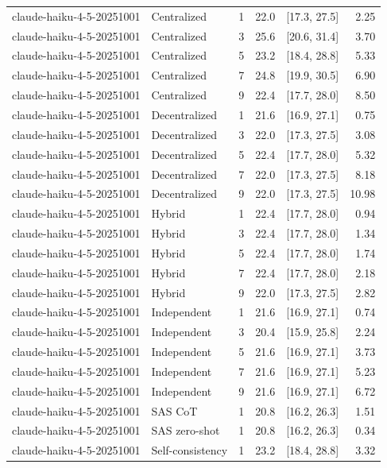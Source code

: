\begin{tabular}{@{}llrrrr@{}}
claude-haiku-4-5-20251001 & Centralized & 1 & 22.0 & [17.3, 27.5] & 2.25 \\
claude-haiku-4-5-20251001 & Centralized & 3 & 25.6 & [20.6, 31.4] & 3.70 \\
claude-haiku-4-5-20251001 & Centralized & 5 & 23.2 & [18.4, 28.8] & 5.33 \\
claude-haiku-4-5-20251001 & Centralized & 7 & 24.8 & [19.9, 30.5] & 6.90 \\
claude-haiku-4-5-20251001 & Centralized & 9 & 22.4 & [17.7, 28.0] & 8.50 \\
claude-haiku-4-5-20251001 & Decentralized & 1 & 21.6 & [16.9, 27.1] & 0.75 \\
claude-haiku-4-5-20251001 & Decentralized & 3 & 22.0 & [17.3, 27.5] & 3.08 \\
claude-haiku-4-5-20251001 & Decentralized & 5 & 22.4 & [17.7, 28.0] & 5.32 \\
claude-haiku-4-5-20251001 & Decentralized & 7 & 22.0 & [17.3, 27.5] & 8.18 \\
claude-haiku-4-5-20251001 & Decentralized & 9 & 22.0 & [17.3, 27.5] & 10.98 \\
claude-haiku-4-5-20251001 & Hybrid & 1 & 22.4 & [17.7, 28.0] & 0.94 \\
claude-haiku-4-5-20251001 & Hybrid & 3 & 22.4 & [17.7, 28.0] & 1.34 \\
claude-haiku-4-5-20251001 & Hybrid & 5 & 22.4 & [17.7, 28.0] & 1.74 \\
claude-haiku-4-5-20251001 & Hybrid & 7 & 22.4 & [17.7, 28.0] & 2.18 \\
claude-haiku-4-5-20251001 & Hybrid & 9 & 22.0 & [17.3, 27.5] & 2.82 \\
claude-haiku-4-5-20251001 & Independent & 1 & 21.6 & [16.9, 27.1] & 0.74 \\
claude-haiku-4-5-20251001 & Independent & 3 & 20.4 & [15.9, 25.8] & 2.24 \\
claude-haiku-4-5-20251001 & Independent & 5 & 21.6 & [16.9, 27.1] & 3.73 \\
claude-haiku-4-5-20251001 & Independent & 7 & 21.6 & [16.9, 27.1] & 5.23 \\
claude-haiku-4-5-20251001 & Independent & 9 & 21.6 & [16.9, 27.1] & 6.72 \\
claude-haiku-4-5-20251001 & SAS CoT & 1 & 20.8 & [16.2, 26.3] & 1.51 \\
claude-haiku-4-5-20251001 & SAS zero-shot & 1 & 20.8 & [16.2, 26.3] & 0.34 \\
claude-haiku-4-5-20251001 & Self-consistency & 1 & 23.2 & [18.4, 28.8] & 3.32 \\

\end{tabular}
